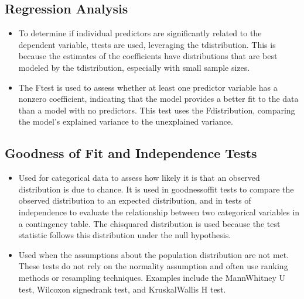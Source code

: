 \documentclass[letterpaper,10pt,english]{jupyterBook}
\begin{document}
\subsection{Regression Analysis}
\label{\detokenize{notebooks/review_stats:regression-analysis}}\begin{itemize}
\item {} 
\sphinxAtStartPar
{} To determine if individual predictors are significantly related to the dependent variable, t\sphinxhyphen{}tests are used, leveraging the t\sphinxhyphen{}distribution. This is because the estimates of the coefficients have distributions that are best modeled by the t\sphinxhyphen{}distribution, especially with small sample sizes.

\item {} 
\sphinxAtStartPar
{} The F\sphinxhyphen{}test is used to assess whether at least one predictor variable has a non\sphinxhyphen{}zero coefficient, indicating that the model provides a better fit to the data than a model with no predictors. This test uses the F\sphinxhyphen{}distribution, comparing the model’s explained variance to the unexplained variance.

\end{itemize}


\subsection{Goodness of Fit and Independence Tests}
\label{\detokenize{notebooks/review_stats:goodness-of-fit-and-independence-tests}}\begin{itemize}
\item {} 
\sphinxAtStartPar
{} Used for categorical data to assess how likely it is that an observed distribution is due to chance. It is used in goodness\sphinxhyphen{}of\sphinxhyphen{}fit tests to compare the observed distribution to an expected distribution, and in tests of independence to evaluate the relationship between two categorical variables in a contingency table. The chi\sphinxhyphen{}squared distribution is used because the test statistic follows this distribution under the null hypothesis.

\item {} 
\sphinxAtStartPar
{} Used when the assumptions about the population distribution are not met. These tests do not rely on the normality assumption and often use ranking methods or resampling techniques. Examples include the Mann\sphinxhyphen{}Whitney U test, Wilcoxon signed\sphinxhyphen{}rank test, and Kruskal\sphinxhyphen{}Wallis H test.

\end{itemize}
\end{document}
